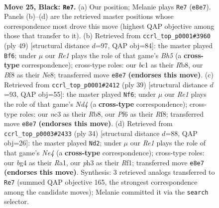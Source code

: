 \documentclass[11pt]{article}
\begin{document}
\clearpage

\begin{figure}[p]\centering
\begin{subfigure}{0.46\textwidth}\centering
\resizebox{\linewidth}{!}{%
\newchessgame
\chessboard[
  setfen={2bqrb1k/rp1p3p/p3pp2/2P4Q/P1nP2B1/2N2N1P/1P3P2/R1B2RK1 b - - 0 25},
  showmover=false,
  pgfstyle=straightmove, color=movearrow, markmove={e8-e7}
]}
\caption{}
\end{subfigure}\hfill
\begin{subfigure}{0.46\textwidth}\centering
\resizebox{\linewidth}{!}{%
\newchessgame
\chessboard[
  setfen={1r1qn1k1/3r1pp1/2bpp2p/1p6/1P1BPPQb/2NR1B1P/2P3P1/5R1K b - - 4 25},
  showmover=false,
  pgfstyle=straightmove, color=movearrow, markmove={h4-f6}
]}
\caption{}
\end{subfigure}
\\[4pt]
\begin{subfigure}{0.46\textwidth}\centering
\resizebox{\linewidth}{!}{%
\newchessgame
\chessboard[
  setfen={1rb2rk1/p1b1qpp1/P1p1p2p/3n4/3PQ3/3B1N2/1P3PPP/R1BR2K1 b - - 3 20},
  showmover=false,
  pgfstyle=straightmove, color=movearrow, markmove={d5-f6}
]}
\caption{}
\end{subfigure}\hfill
\begin{subfigure}{0.46\textwidth}\centering
\resizebox{\linewidth}{!}{%
\newchessgame
\chessboard[
  setfen={r1b1k2r/1p2bpp1/p3n3/3qP2p/P1ppN3/1P6/B1P1NPPP/R2Q1R1K w kq - 2 18},
  showmover=false,
  pgfstyle=straightmove, color=movearrow, markmove={e4-d2}
]}
\caption{}
\end{subfigure}
\caption{\textbf{Move 25, Black: \texttt{Re7}.} (a) Our position; Melanie plays \texttt{Re7} (\texttt{e8e7}). Panels (b)--(d) are the retrieved master positions whose correspondence most drove this move (highest QAP objective among those that transfer to it). (b) Retrieved from \texttt{ccrl\_top\_p0001\#3960} (ply 49) [structural distance $d$=97, QAP obj=84]: the master played \texttt{Bf6}; under $\mu$ our \emph{Re1} plays the role of that game's \emph{Bh5} (a \textbf{cross-type} correspondence); cross-type roles: our \emph{b}c1 as their \emph{R}b8, our \emph{B}f8 as their \emph{N}e8; transferred move \texttt{e8e7} \textbf{(endorses this move)}. (c) Retrieved from \texttt{ccrl\_top\_p0001\#2412} (ply 39) [structural distance $d$=93, QAP obj=55]: the master played \texttt{Nf6}; under $\mu$ our \emph{Re1} plays the role of that game's \emph{Nd4} (a \textbf{cross-type} correspondence); cross-type roles: our \emph{n}c3 as their \emph{R}b8, our \emph{P}f6 as their \emph{R}f8; transferred move \texttt{e8e7} \textbf{(endorses this move)}. (d) Retrieved from \texttt{ccrl\_top\_p0003\#2433} (ply 34) [structural distance $d$=88, QAP obj=26]: the master played \texttt{Nd2}; under $\mu$ our \emph{Re1} plays the role of that game's \emph{Ne4} (a \textbf{cross-type} correspondence); cross-type roles: our \emph{b}g4 as their \emph{R}a1, our \emph{p}h3 as their \emph{R}f1; transferred move \texttt{e8e7} \textbf{(endorses this move)}. Synthesis: 3 retrieved analogs transferred to \texttt{Re7} (summed QAP objective 165, the strongest correspondence among the candidate moves); Melanie committed it via the \texttt{search} selector.}
\label{fig:thought-m49}
\end{figure}
\end{document}
